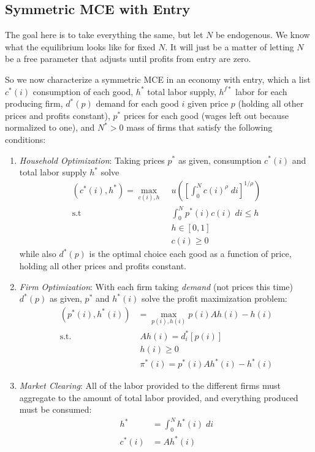 \documentclass[12pt]{article}
\theoremstyle{plain}
\theoremstyle{definition}
\theoremstyle{remark}
\newcommand{\intzN}{\int_0^N}
\begin{document}
\clearpage
\subsection{Symmetric MCE with Entry}

The goal here is to take everything the same, but let $N$ be endogenous.
We know what the equilibrium looks like for fixed $N$. It will just be a
matter of letting $N$ be a free parameter that adjusts until profits
from entry are zero.

So we now characterize a symmetric MCE in an economy with entry, which a
list
$c^*(i)$ consumption of each good,
$h^*$ total labor supply,
$h^{f*}$ labor for each producing firm,
$d^*(p)$ demand for each good $i$ given price $p$ (holding all other
prices and profits constant),
$p^*$ prices for each good (wages left out because normalized to one),
and $N^*>0$ mass of firms that satisfy the following conditions:
\begin{enumerate}
  \item \emph{Household Optimization}: Taking prices $p^*$ as given,
    consumption $c^*(i)$ and total labor supply $h^*$ solve
    \begin{align*}
      (c^*(i), h^*)
      = \max_{c(i), h}
        & \; u\left(
          \left[ \int_0^N c(i)^\rho \; di \right]^{1/\rho}
        \right)\\
      \text{s.t} & \;
        \intzN p^*(i) c(i) \; di \leq h \\
      &\; h\in[0,1] \\
      &\; c(i) \geq 0
    \end{align*}
    while also $d^*(p)$ is the optimal choice each good as a function of
    price, holding all other prices and profits constant.

  \item \emph{Firm Optimization}: With each firm taking \emph{demand}
    (not prices this time) $d^*(p)$ as given, $p^*$ and $h^*(i)$
    solve the profit maximization problem:
    \begin{align*}
      (p^*(i),h^*(i))
      &=
      \max_{p(i),h(i)}
      p(i) Ah(i) - h(i) \\
      \text{s.t.} \;
      & \; Ah(i) = d_i^*[p(i)] \\
      & \; h(i) \geq 0\\
      & \; \pi^*(i) = p^*(i) Ah^*(i) - h^*(i)
    \end{align*}

  \item \emph{Market Clearing}: All of the labor provided to the
    different firms must aggregate to the amount of total labor
    provided, and everything produced must be consumed:
    \begin{align*}
       h^* &= \intzN h^*(i) \; di \\
       c^*(i) &= Ah^*(i)
    \end{align*}
\end{enumerate}
\end{document}
